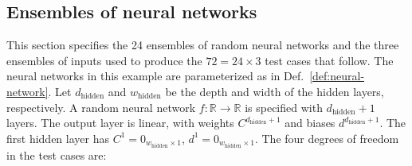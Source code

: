 \documentclass{article}
\begin{document}
\subsection*{Ensembles of neural networks}
This section specifies the 24 ensembles of random neural networks and the three ensembles of inputs used to produce the \(72 = 24 \times 3\) test cases that follow.
The neural networks in this example are parameterized as in Def.~\ref{def:neural-network}.
Let \(d_\mathrm{hidden}\) and \(w_\mathrm{hidden}\) be the depth and width of the hidden layers, respectively.
A random neural network \(f:\mathbb{R} \to \mathbb{R}\) is specified with \(d_\mathrm{hidden} + 1\) layers.
The output layer is linear, with weights \(C^{d_\mathrm{hidden}+1}\) and biases \(d^{d_\mathrm{hidden}+1}\).
The first hidden layer has \(C^1 = 0_{w_\mathrm{hidden} \times 1}\), \(d^1 = 0_{w_\mathrm{hidden} \times 1}\).
The four degrees of freedom in the test cases are:
\end{document}
